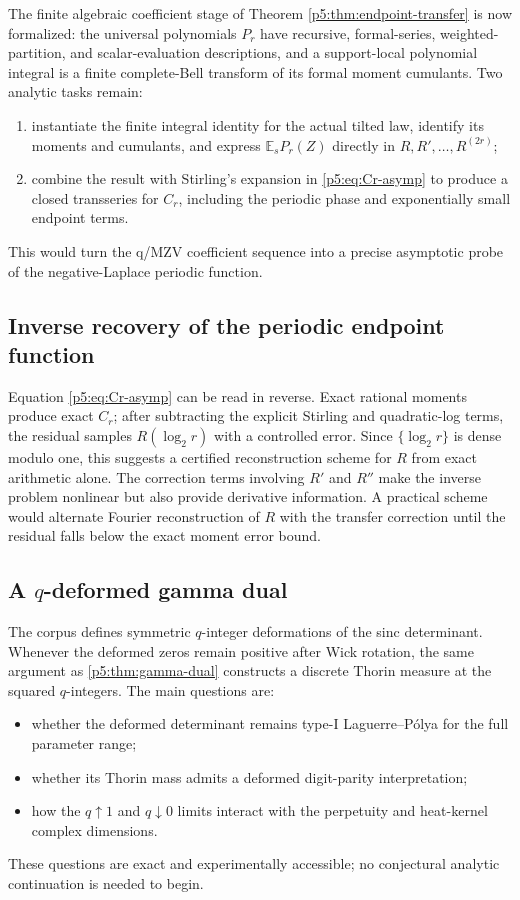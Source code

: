 \documentclass[11pt]{article}
\numberwithin{equation}{section}
\theoremstyle{definition}
\theoremstyle{remark}
\newcommand{\E}{\mathbb E}
\begin{document}
The finite algebraic coefficient stage of Theorem \ref{p5:thm:endpoint-transfer}
is now formalized: the universal polynomials \(P_r\) have recursive,
formal-series, weighted-partition, and scalar-evaluation descriptions, and a
support-local polynomial integral is a finite complete-Bell transform of its
formal moment cumulants.  Two analytic tasks remain:
\begin{enumerate}
\item instantiate the finite integral identity for the actual tilted law,
      identify its moments and cumulants, and express
      $\E_sP_r(Z)$ directly in $R,R',\dots,R^{(2r)}$;
\item combine the result with Stirling's expansion in \cref{p5:eq:Cr-asymp} to
      produce a closed transseries for $C_r$, including the periodic phase and
      exponentially small endpoint terms.
\end{enumerate}
This would turn the q/MZV coefficient sequence into a precise asymptotic probe
of the negative-Laplace periodic function.

\subsection{Inverse recovery of the periodic endpoint function}

Equation \cref{p5:eq:Cr-asymp} can be read in reverse.  Exact rational moments
produce exact $C_r$; after subtracting the explicit Stirling and quadratic-log
terms, the residual samples $R(\log_2r)$ with a controlled error.  Since
$\{\log_2r\}$ is dense modulo one, this suggests a certified reconstruction
scheme for $R$ from exact arithmetic alone.  The correction terms involving
$R'$ and $R''$ make the inverse problem nonlinear but also provide derivative
information.  A practical scheme would alternate Fourier reconstruction of
$R$ with the transfer correction until the residual falls below the exact
moment error bound.

\subsection{A $q$-deformed gamma dual}

The corpus defines symmetric $q$-integer deformations of the sinc determinant.
Whenever the deformed zeros remain positive after Wick rotation, the same
argument as \cref{p5:thm:gamma-dual} constructs a discrete Thorin measure at the
squared $q$-integers.  The main questions are:
\begin{itemize}
\item whether the deformed determinant remains type-I Laguerre--P\'olya for the
      full parameter range;
\item whether its Thorin mass admits a deformed digit-parity interpretation;
\item how the $q\uparrow1$ and $q\downarrow0$ limits interact with the
      perpetuity and heat-kernel complex dimensions.
\end{itemize}
These questions are exact and experimentally accessible; no conjectural
analytic continuation is needed to begin.
\end{document}
